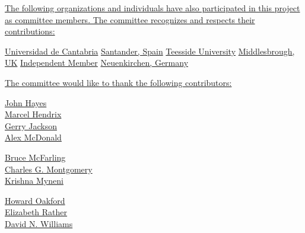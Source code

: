 \cbstart{}
\uline{%
The following organizations and individuals have also participated in
this project as committee members. The committee recognizes and
respects their contributions:}

	{}	{\uline{Universidad de Cantabria}}	{\uline{Santander, Spain}}
		{}		{\uline{Teesside University}}		{\uline{Middlesbrough, UK}}
	{}		{\uline{Independent Member}}		{\uline{Neuenkirchen, Germany}}

\uline{%
The committee would like to thank the following contributors:}

\begin{minipage}[t]{.3\linewidth}
\uline{John		Hayes} \\
\uline{Marcel		Hendrix} \\
\uline{Gerry		Jackson} \\
\uline{Alex		McDonald} \\
\end{minipage}
\hfill
\begin{minipage}[t]{.3\linewidth}
\uline{Bruce		McFarling} \\
\uline{Charles G.	Montgomery} \\
\uline{Krishna	Myneni} \\
\end{minipage}
\hfill
\begin{minipage}[t]{.3\linewidth}
\uline{Howard	Oakford} \\
\uline{Elizabeth	Rather} \\
\uline{David N.	Williams} \\
\end{minipage}
\cbend